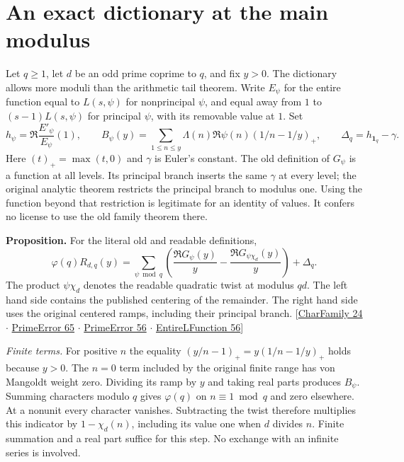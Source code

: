 \documentclass[12pt,letterpaper]{article}
\begin{document}
\section{An exact dictionary at the main modulus}\label{sec:dictionary}
Let $q\ge1$, let $d$ be an odd prime coprime to $q$, and fix $y>0$. The dictionary allows more moduli than the arithmetic tail theorem. Write $E_\psi$ for the entire function equal to $L(s,\psi)$ for nonprincipal $\psi$, and equal away from $1$ to $(s-1)L(s,\psi)$ for principal $\psi$, with its removable value at $1$. Set
\[
 h_\psi=\Re\frac{E'_\psi}{E_\psi}(1),\qquad
 B_\psi(y)=\sum_{1\le n\le y}\Lambda(n)\Re\psi(n)(1/n-1/y)_+,\qquad
 \Delta_q=h_{\mathbf1_q}-\gamma .
\]
Here $(t)_+=\max(t,0)$ and $\gamma$ is Euler's constant. The old definition of $G_\psi$ is a function at all levels. Its principal branch inserts the same $\gamma$ at every level; the original analytic theorem restricts the principal branch to modulus one. Using the function beyond that restriction is legitimate for an identity of values. It confers no license to use the old family theorem there.

\textbf{Proposition.} For the literal old and readable definitions,
\begin{equation}\label{eq:bridge}
 \varphi(q)R_{d,q}(y)=\sum_{\psi\bmod q}
  \left(\frac{\Re G_\psi(y)}y-\frac{\Re G_{\psi\chi_d}(y)}y\right)+\Delta_q .
\end{equation}
The product $\psi\chi_d$ denotes the readable quadratic twist at modulus $qd$. The left hand side contains the published centering of the remainder. The right hand side uses the original centered ramps, including their principal branch. {\small\sffamily\color{mute}[\href{https://github.com/nousentllc/riemann-hypothesis/blob/40e56bab026552e089d7afcfeff08d2defb9c005/src/Development/AutomorphicArithmetic/DedekindLFunctions/CharFamily.lean#L24}{CharFamily 24} $\cdot$ \href{https://github.com/leanprover-community/riemann-hypothesis/blob/e063a923620ee7787b4a1270421478645bf66bdb/src/New/Reduction/Zeros/PrimeError.lean#L65}{PrimeError 65} $\cdot$ \href{https://github.com/leanprover-community/riemann-hypothesis/blob/e063a923620ee7787b4a1270421478645bf66bdb/src/New/Reduction/Zeros/PrimeError.lean#L56}{PrimeError 56} $\cdot$ \href{https://github.com/leanprover-community/riemann-hypothesis/blob/e063a923620ee7787b4a1270421478645bf66bdb/src/Lib/Analytic/EntireLFunction.lean#L56}{EntireLFunction 56}]}

\emph{Finite terms.} For positive $n$ the equality
$(y/n-1)_+=y(1/n-1/y)_+$ holds because $y>0$. The $n=0$ term included by the original finite range has von Mangoldt weight zero. Dividing its ramp by $y$ and taking real parts produces $B_\psi$. Summing characters modulo $q$ gives $\varphi(q)$ on $n\equiv1\bmod q$ and zero elsewhere. At a nonunit every character vanishes. Subtracting the twist therefore multiplies this indicator by $1-\chi_d(n)$, including its value one when $d$ divides $n$. Finite summation and a real part suffice for this step. No exchange with an infinite series is involved.
\end{document}
